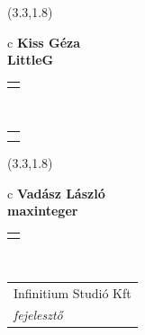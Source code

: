 \documentclass[11pt]{article}
\begin{document}
\makebox(3.3,1.8){
  \renewcommand\arraystretch{1.3}
  \begin{tabular}[c]{c}
    \hspace{8.5mm}
    \LARGE\bf{ Kiss Géza }\\
    \hspace{8.5mm}
    \Large{ LittleG }\\
    \renewcommand\arraystretch{3}
    \begin{tabular}[c]{c}
      \centering
      \fontfamily{phv}\selectfont{
        \textbf{
          \textsc{
            \scriptsize{
            \color{Bright}{ Ismerkedő }\color{Bright}{ Webmester }\color{Bright}{ Sminkmester }\color{Dark}{ Programozó }
            }
          }
        }
      }
    \end{tabular}
    \\
    \renewcommand\arraystretch{1}
    \begin{tabular}{p{3.3in}}
      \hspace{.7cm}\\
      \hspace{.7cm}\emph{  }\\
    \end{tabular}
  \end{tabular}
}

\makebox(3.3,1.8){
  \renewcommand\arraystretch{1.3}
  \begin{tabular}[c]{c}
    \hspace{8.5mm}
    \LARGE\bf{ Vadász László }\\
    \hspace{8.5mm}
    \Large{ maxinteger }\\
    \renewcommand\arraystretch{3}
    \begin{tabular}[c]{c}
      \centering
      \fontfamily{phv}\selectfont{
        \textbf{
          \textsc{
            \scriptsize{
            \color{Dark}{ Ismerkedő }\color{Bright}{ Webmester }\color{Bright}{ Sminkmester }\color{Bright}{ Programozó }
            }
          }
        }
      }
    \end{tabular}
    \\
    \renewcommand\arraystretch{1}
    \begin{tabular}{p{3.3in}}
      \hspace{.7cm}Infinitium Studió Kft\\
      \hspace{.7cm}\emph{ fejelesztő }\\
    \end{tabular}
  \end{tabular}
}
\end{document}
